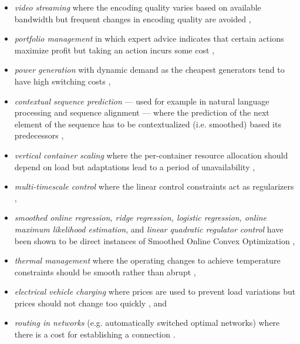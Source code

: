 \begin{itemize}
    \item \textit{video streaming} where the encoding quality varies based on available bandwidth but frequent changes in encoding quality are avoided \cite{Lin2012},
    \item \textit{portfolio management} in which expert advice indicates that certain actions maximize profit but taking an action incurs some cost \cite{Calafiore2008, Das2014, Ballu2019},
    \item \textit{power generation} with dynamic demand as the cheapest generators tend to have high switching costs \cite{Lin2012, Badiei2015},
    \item \textit{contextual sequence prediction} --- used for example in natural language processing and sequence alignment --- where the prediction of the next element of the sequence has to be contextualized (i.e. smoothed) based its predecessors \cite{Kim2015},
    \item \textit{vertical container scaling} where the per-container resource allocation should depend on load but adaptations lead to a period of unavailability \cite{Rossi2019},
    \item \textit{multi-timescale control} where the linear control constraints act as regularizers \cite{Goel2017},
    \item \textit{smoothed online regression, ridge regression, logistic regression, online maximum likelihood estimation}, and \textit{linear quadratic regulator control} have been shown to be direct instances of Smoothed Online Convex Optimization \cite{Goel2018},
    \item \textit{thermal management} where the operating changes to achieve temperature constraints should be smooth rather than abrupt \cite{Zanini2009},
    \item \textit{electrical vehicle charging} where prices are used to prevent load variations but prices should not change too quickly \cite{Kim2014}, and
    \item \textit{routing in networks} (e.g. automatically switched optimal networks) where there is a cost for establishing a connection \cite{Lin2012}.
\end{itemize}


